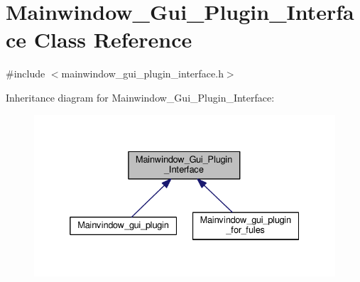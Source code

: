 \hypertarget{classMainwindow__Gui__Plugin__Interface}{}\section{Mainwindow\+\_\+\+Gui\+\_\+\+Plugin\+\_\+\+Interface Class Reference}
\label{classMainwindow__Gui__Plugin__Interface}


{\ttfamily \#include $<$mainwindow\+\_\+gui\+\_\+plugin\+\_\+interface.\+h$>$}



Inheritance diagram for Mainwindow\+\_\+\+Gui\+\_\+\+Plugin\+\_\+\+Interface\+:\nopagebreak
\begin{figure}[H]
\begin{center}
\leavevmode
\includegraphics[width=332pt]{classMainwindow__Gui__Plugin__Interface__inherit__graph}
\end{center}
\end{figure}
